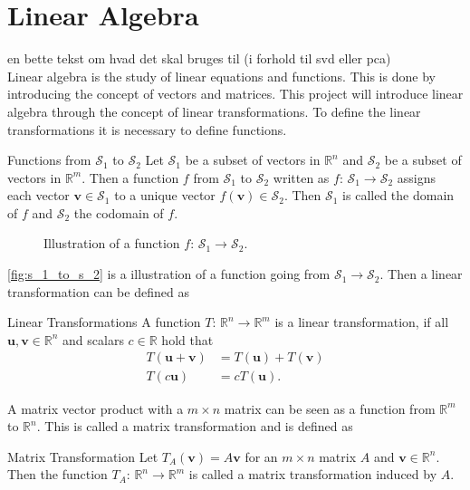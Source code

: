 \chapter {Linear Algebra} 
en bette tekst om hvad det skal bruges til (i forhold til svd eller pca)\\
Linear algebra is the study of linear equations and functions. This is done by introducing the concept of vectors and matrices. This project will introduce linear algebra through the concept of linear transformations. To define the linear transformations it is necessary to define functions.
\begin{definition}{Functions from $\mathcal{S}_1$ to $\mathcal{S}_2$}
    Let $\mathcal{S}_1$ be a subset of vectors in $\mathbb{R}^n$ and $\mathcal{S}_2$ be a subset of vectors in $\mathbb{R}^m$. Then a function $f$ from $\mathcal{S}_1$ to $\mathcal{S}_2$ written as $f$: $\mathcal{S}_1 \rightarrow \mathcal{S}_2$ assigns each vector $\textbf{v} \in \mathcal{S}_1$ to a unique vector $f(\textbf{v})\in \mathcal{S}_2$. Then $\mathcal{S}_1$ is called the domain of $f$ and $\mathcal{S}_2$ the codomain of $f$. \cite[167]{LiAl}
\end{definition}
\begin{figure} [H]
    \centering
    
    \caption{Illustration of a function $f$: $\mathcal{S}_1 \rightarrow \mathcal{S}_2$.}
    \label{fig:s_1_to_s_2}
\end{figure}
\autoref{fig:s_1_to_s_2} is a illustration of a function going from $\mathcal{S}_1 \rightarrow \mathcal{S}_2$. 
\noindent Then a linear transformation can be defined as 
\begin{definition}{Linear Transformations}
    A function $T$: $\mathbb{R}^n \rightarrow \mathbb{R}^m$ is a linear transformation, if all $\textbf{u}, \textbf{v} \in \mathbb{R}^n$ and scalars $c \in \mathbb{R}$ hold that 
    \begin{align*}
        T(\textbf{u}+\textbf{v})&=T(\textbf{u})+T(\textbf{v})\\
        T(c\textbf{u})&=cT(\textbf{u}).
    \end{align*}
    \cite[171]{LiAl}
\end{definition}
A matrix vector product with a $m \times n$ matrix can be seen as a function from $\mathbb{R}^m$ to $\mathbb{R}^n$. This is called a matrix transformation and is defined as
\begin{definition}{Matrix Transformation}
    Let $T_A(\textbf{v})=A\textbf{v}$ for an $m\times n$ matrix $A$ and $\textbf{v} \in \mathbb{R}^n$. Then the function $T_A$: $\mathbb{R}^n \rightarrow \mathbb{R}^m$ is called a matrix transformation induced by $A$. \cite[168]{LiAl}
\end{definition}
